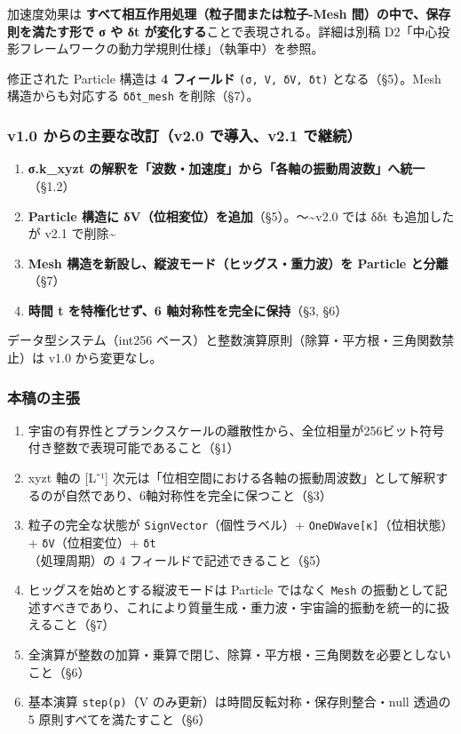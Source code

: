\documentclass[a4paper,11pt]{ltjsarticle}
\providecommand{\tightlist}{\setlength{\itemsep}{0pt}\setlength{\parskip}{0pt}}
\begin{document}
加速度効果は \textbf{すべて相互作用処理（粒子間または粒子-Mesh
間）の中で、保存則を満たす形で σ や δt
が変化する}ことで表現される。詳細は別稿
D2「中心投影フレームワークの動力学規則仕様」（執筆中）を参照。

修正された Particle 構造は \textbf{4 フィールド}
\texttt{(σ,\ V,\ δV,\ δt)} となる（§5）。Mesh 構造からも対応する
\texttt{δδt\_mesh} を削除（§7）。

\subsubsection{v1.0 からの主要な改訂（v2.0 で導入、v2.1
で継続）}\label{v1.0-ux304bux3089ux306eux4e3bux8981ux306aux6539ux8a02v2.0-ux3067ux5c0eux5165v2.1-ux3067ux7d99ux7d9a}

\begin{enumerate}
\def\labelenumi{\arabic{enumi}.}
\tightlist
\item
  \textbf{σ.k\_xyzt
  の解釈を「波数・加速度」から「各軸の振動周波数」へ統一}（§1.2）
\item
  \textbf{Particle 構造に
  δV（位相変位）を追加}（§5）。〜\textasciitilde v2.0 では δδt
  も追加したが v2.1 で削除\textasciitilde{}
\item
  \textbf{Mesh 構造を新設し、縦波モード（ヒッグス・重力波）を Particle
  と分離}（§7）
\item
  \textbf{時間 t を特権化せず、6 軸対称性を完全に保持}（§3, §6）
\end{enumerate}

データ型システム（int256
ベース）と整数演算原則（除算・平方根・三角関数禁止）は v1.0
から変更なし。

\subsubsection{本稿の主張}\label{ux672cux7a3fux306eux4e3bux5f35}

\begin{enumerate}
\def\labelenumi{\arabic{enumi}.}
\tightlist
\item
  宇宙の有界性とプランクスケールの離散性から、全位相量が256ビット符号付き整数で表現可能であること（§1）
\item
  xyzt 軸の {[}L⁻¹{]}
  次元は「位相空間における各軸の振動周波数」として解釈するのが自然であり、6軸対称性を完全に保つこと（§3）
\item
  粒子の完全な状態が \texttt{SignVector}（個性ラベル）+
  \texttt{OneDWave{[}κ{]}}（位相状態）+ \texttt{δV}（位相変位）+
  \texttt{δt}（処理周期）の 4 フィールドで記述できること（§5）
\item
  ヒッグスを始めとする縦波モードは Particle ではなく \texttt{Mesh}
  の振動として記述すべきであり、これにより質量生成・重力波・宇宙論的振動を統一的に扱えること（§7）
\item
  全演算が整数の加算・乗算で閉じ、除算・平方根・三角関数を必要としないこと（§6）
\item
  基本演算 \texttt{step(p)}（V
  のみ更新）は時間反転対称・保存則整合・null 透過の 5
  原則すべてを満たすこと（§6）
\end{enumerate}
\end{document}
